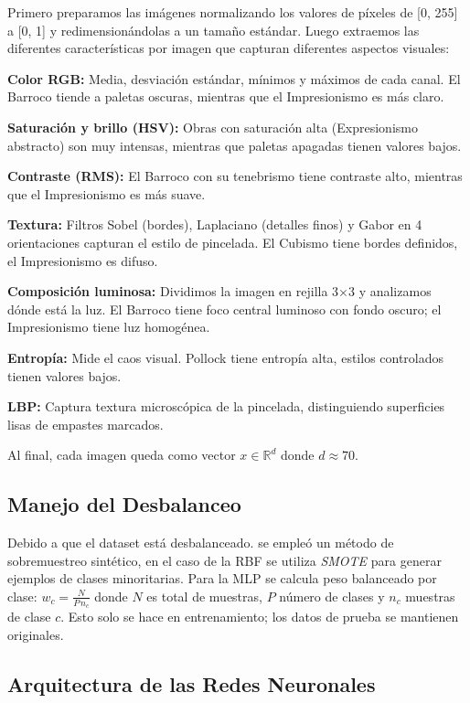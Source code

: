 \documentclass[8pt,a4paper]{article}
\begin{document}
Primero preparamos las imágenes normalizando los valores de píxeles de [0, 255] a [0, 1] y redimensionándolas a un tamaño estándar. Luego extraemos las diferentes características por imagen que capturan diferentes aspectos visuales:

\textbf{Color RGB:} Media, desviación estándar, mínimos y máximos de cada canal. El Barroco tiende a paletas oscuras, mientras que el Impresionismo es más claro.

\textbf{Saturación y brillo (HSV):} Obras con saturación alta (Expresionismo abstracto) son muy intensas, mientras que paletas apagadas tienen valores bajos.

\textbf{Contraste (RMS):} El Barroco con su tenebrismo tiene contraste alto, mientras que el Impresionismo es más suave.

\textbf{Textura:} Filtros Sobel (bordes), Laplaciano (detalles finos) y Gabor en 4 orientaciones capturan el estilo de pincelada. El Cubismo tiene bordes definidos, el Impresionismo es difuso.

\textbf{Composición luminosa:} Dividimos la imagen en rejilla 3×3 y analizamos dónde está la luz. El Barroco tiene foco central luminoso con fondo oscuro; el Impresionismo tiene luz homogénea.

\textbf{Entropía:} Mide el caos visual. Pollock tiene entropía alta, estilos controlados tienen valores bajos.

\textbf{LBP:} Captura textura microscópica de la pincelada, distinguiendo superficies lisas de empastes marcados.

Al final, cada imagen queda como vector $x\in\mathbb{R}^d$ donde $d\approx70$.

\subsection{Manejo del Desbalanceo}

Debido a que el dataset está desbalanceado. se empleó un método de sobremuestreo sintético, en el caso de la RBF se utiliza \emph{SMOTE} para generar ejemplos de clases minoritarias. Para la MLP se calcula peso balanceado por clase: $w_c=\frac{N}{P\,n_c}$ donde $N$ es total de muestras, $P$ número de clases y $n_c$ muestras de clase $c$. Esto solo se hace en entrenamiento; los datos de prueba se mantienen originales.

\subsection{Arquitectura de las Redes Neuronales}
\end{document}
